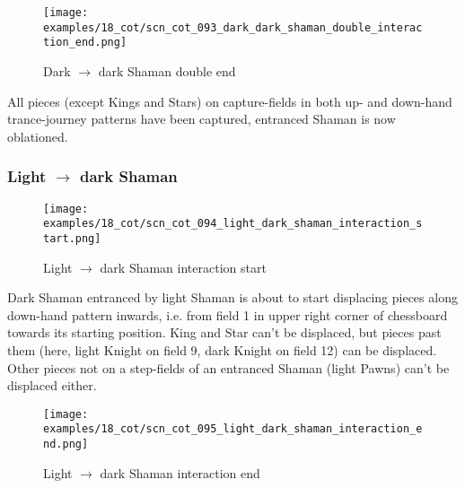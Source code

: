 \noindent
\begin{figure}[!h]
\texttt{[image: examples/18\_cot/scn\_cot\_093\_dark\_dark\_shaman\_double\_interaction\_end.png]}
\caption{Dark $\rightarrow$ dark Shaman double end}
\label{fig:scn_cot_093_dark_dark_shaman_double_interaction_end}
\end{figure}

All pieces (except Kings and Stars) on capture-fields in both up- and down-hand
trance-journey patterns have been captured, entranced Shaman is now oblationed.

\clearpage %

\subsubsection*{Light $\rightarrow$ dark Shaman}
\label{sec:Conquest of Tlalocan/Trance-journey/Interactions/Light --> dark Shaman}

\vspace*{-1.5\baselineskip}
\noindent
\begin{figure}[!h]
\texttt{[image: examples/18\_cot/scn\_cot\_094\_light\_dark\_shaman\_interaction\_start.png]}
\vspace*{-1.4\baselineskip}
\caption{Light $\rightarrow$ dark Shaman interaction start}
\label{fig:scn_cot_094_light_dark_shaman_interaction_start}
\end{figure}

\vspace*{-0.5\baselineskip}
Dark Shaman entranced by light Shaman is about to start displacing pieces along
down-hand pattern inwards, i.e. from field 1 in upper right corner of chessboard
towards its starting position.\newline
\indent
King and Star can't be displaced, but pieces past them (here, light Knight on field
9, dark Knight on field 12) can be displaced. Other pieces not on a step-fields of
an entranced Shaman (light Pawns) can't be displaced either.

\clearpage %

\noindent
\begin{figure}[!h]
\texttt{[image: examples/18\_cot/scn\_cot\_095\_light\_dark\_shaman\_interaction\_end.png]}
\caption{Light $\rightarrow$ dark Shaman interaction end}
\label{fig:scn_cot_095_light_dark_shaman_interaction_end}
\end{figure}

